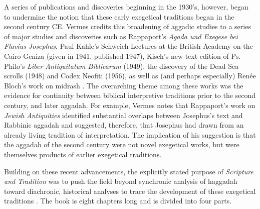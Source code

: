 A series of publications and discoveries beginning in the 1930's,
however, began to undermine the notion that these early exegetical
traditions began in the second century CE. Vermes credits this
broadening of aggadic studies to a series of major studies and
discoveries such as Rappaport's \emph{Agada und Exegese bei Flavius
Josephus},\autocite{rappaport1930} Paul Kahle's Schweich Lectures at the
British Academy on the Cairo Geniza (given in 1941, published
1947),\autocite{kahle1947} Kisch's new text edition of Ps. Philo's
\emph{Liber Antiquitatum Biblicarum} (1949),\autocite{kisch1949} the
discovery of the Dead Sea scrolls (1948) and Codex Neofiti (1956), as
well as (and perhaps especially) Renée Bloch's work on midrash
\autocites{bloch1954}{bloch1955_repr}[3--7]{vermes1961}. The overarching
theme among these works was the evidence for continuity between biblical
interpretive traditions prior to the second century, and later aggadah.
For example, Vermes notes that Rappaport's work on \emph{Jewish
Antiquities} identified substantial overlaps between Josephus's text and
Rabbinic aggadah and suggested, therefore, that Josephus had drawn from
an already living tradition of interpretation. The implication of his
suggestion is that the aggadah of the second century were not novel
exegetical works, but were themselves products of earlier exegetical
traditions.

Building on these recent advancements, the explicitly stated purpose of
\emph{Scripture and Tradition} was to push the field beyond synchronic
analysis of haggadah toward diachronic, historical analyses to trace the
development of these exegetical traditions \autocites[1]{vermes1961}[See
esp.][GET\_PAGE]{bloch1955_repr}. The book is eight chapters long and is
divided into four parts.

